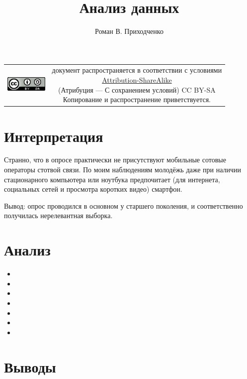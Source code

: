 \documentclass[unicode, 12pt, a4paper,oneside,fleqn]{article}
\author{Роман В. Приходченко}
\title{Анализ данных}
\begin{document}
\renewcommand\bibname{СПИСОК ЛИТЕРАТУРЫ}
\renewcommand\refname{\centering Список литературы}
\renewcommand\contentsname{\centering Содержание}



\makeatletter %
\maketitle

\begin{table}[ht]
  \begin{tabular}{cc}
    \includegraphics[width=2cm]{../CC_BY-SA_88x31.png} &
    \shortstack{документ распространяется в соответствии с
      условиями\\
      \href{http://creativecommons.org/licenses/by-sa/3.0/}{Attribution-ShareAlike} \\
      (Атрибуция — С сохранением условий) CC BY-SA \\
      Копирование и распространение приветствуется.}
  \end{tabular}
\end{table}

\newpage
\tableofcontents

\newpage

\section{Интерпретация}
Странно, что в опросе практически не присутствуют мобильные сотовые
операторы стотвой связи. По моим наблюдениям молодёжь даже при наличии
стационарного компьютера или ноутбука предпочитает (для интернета,
социальных сетей и просмотра коротких видео) смартфон.

Вывод: опрос проводился в основном у старшего поколения, и
соответственно получилась нерелевантная выборка.

\section{Анализ}
\begin{itemize}
\item 
\item 
\item
\item 
\item 
\item 
\item 
\end{itemize}

\section{Выводы}
\end{document}
